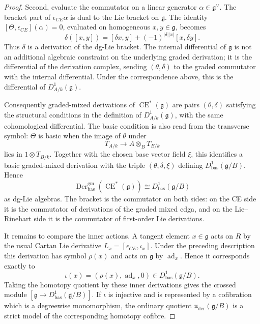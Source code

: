\documentclass[10pt,a4paper]{amsart}
\DeclareMathOperator{\CE}{CE}
\DeclareMathOperator{\Der}{Der}
\newcommand{\bas}{\mathrm{bas}}
\newcommand{\gm}{\mathrm{gm}}
\newcommand{\g}{\mathfrak g}
\newcommand{\kk}{k}
\newcommand{\uuder}{\mathfrak u_{\mathrm{der}}}
\begin{document}
\begin{proof}
Second, evaluate the commutator on a linear generator \(\alpha\in\g^\vee\). The bracket part of \(\epsilon_{CE}\alpha\) is dual to the Lie bracket on \(\g\). The identity \([\Theta,\epsilon_{CE}](\alpha)=0\), evaluated on homogeneous \(x,y\in\g\), becomes
\[
 \delta([x,y])=[\delta x,y]+(-1)^{|\delta||x|}[x,\delta y].
\]
Thus \(\delta\) is a derivation of the dg-Lie bracket. The internal differential of \(\g\) is not an additional algebraic constraint on the underlying graded derivation; it is the differential of the derivation complex, sending \((\theta,\delta)\) to the graded commutator with the internal differential. Under the correspondence above, this is the differential of \(D^1_{A/\kk}(\g)\).

Consequently graded-mixed derivations of \(\CE^*(\g)\) are pairs \((\theta,\delta)\) satisfying the structural conditions in the definition of \(D^1_{A/\kk}(\g)\), with the same cohomological differential. The basic condition is also read from the transverse symbol: \(\Theta\) is basic when the image of \(\theta\) under
\[
 T_{A/\kk}\longrightarrow A\otimes_B T_{B/\kk}
\]
lies in \(1\otimes T_{B/\kk}\). Together with the chosen base vector field \(\xi\), this identifies a basic graded-mixed derivation with the triple \((\theta,\delta,\xi)\) defining \(D^1_{\bas}(\g/B)\). Hence
\[
 \Der^{\gm}_{\bas}(\CE^*(\g))\cong D^1_{\bas}(\g/B)
\]
as dg-Lie algebras. The bracket is the commutator on both sides: on the CE side it is the commutator of derivations of the graded mixed cdga, and on the Lie--Rinehart side it is the commutator of first-order Lie derivations.

It remains to compare the inner actions. A tangent element \(x\in\g\) acts on \(R\) by the usual Cartan Lie derivative \(L_x=[\epsilon_{CE},\iota_x]\). Under the preceding description this derivation has symbol \(\rho(x)\) and acts on \(\g\) by \(\operatorname{ad}_x\). Hence it corresponds exactly to
\[
 \iota(x)=(\rho(x),\operatorname{ad}_x,0)\in D^1_{\bas}(\g/B).
\]
Taking the homotopy quotient by these inner derivations gives the crossed module \([\g\to D^1_{\bas}(\g/B)]\). If \(\iota\) is injective and is represented by a cofibration which is a degreewise monomorphism, the ordinary quotient \(\uuder(\g/B)\) is a strict model of the corresponding homotopy cofibre.
\end{proof}
\end{document}
